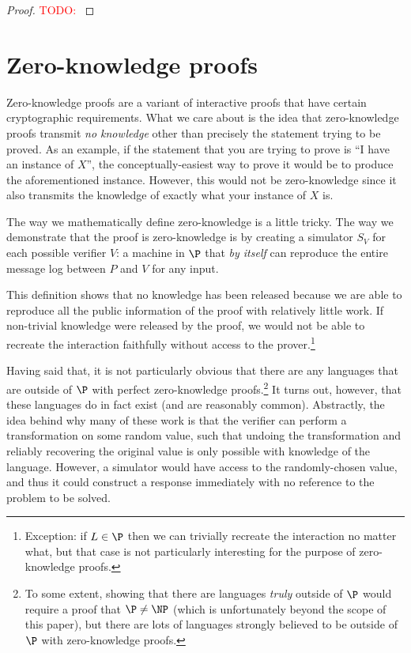\documentclass[english,12pt]{reedthesis}
\theoremstyle{plain}
\theoremstyle{definition}
\theoremstyle{remark}
\newcommand{\TODO}[1]{\textcolor{red}{TODO: #1}}
\begin{document}
\begin{proof}
  \TODO{}
\end{proof}

\section{Zero-knowledge proofs}\label{sec:zero-knowledge}

Zero-knowledge proofs are a variant of interactive proofs that have certain
cryptographic requirements. What we care about is the idea that zero-knowledge
proofs transmit \emph{no knowledge} other than precisely the statement trying to
be proved. As an example, if the statement that you are trying to prove is ``I
have an instance of $X$'', the conceptually-easiest way to prove it would be to
produce the aforementioned instance. However, this would not be zero-knowledge
since it also transmits the knowledge of exactly what your instance of $X$ is.

The way we mathematically define zero-knowledge is a little tricky. The way we
demonstrate that the proof is zero-knowledge is by creating a simulator $S_{V}$
for each possible verifier $V$: a machine in $\P$ that \emph{by itself} can
reproduce the entire message log between $P$ and $V$ for any input.

This definition shows that no knowledge has been released because we are able to
reproduce all the public information of the proof with relatively little work.
If non-trivial knowledge were released by the proof, we would not be able to
recreate the interaction faithfully without access to the
prover.\footnote{Exception: if $L \in \P$ then we can trivially recreate the
  interaction no matter what, but that case is not particularly interesting for
  the purpose of zero-knowledge proofs.}

Having said that, it is not particularly obvious that there are any languages
that are outside of $\P$ with perfect zero-knowledge proofs.\footnote{To some
  extent, showing that there are languages \emph{truly} outside of $\P$ would
  require a proof that $\P \ne \NP$ (which is unfortunately beyond the scope of
  this paper), but there are lots of languages strongly believed to be outside
  of $\P$ with zero-knowledge proofs.} It turns out, however, that these
languages do in fact exist (and are reasonably common). Abstractly, the idea
behind why many of these work is that the verifier can perform a transformation
on some random value, such that undoing the transformation and reliably
recovering the original value is only possible with knowledge of the language.
However, a simulator would have access to the randomly-chosen value, and thus it
could construct a response immediately with no reference to the problem to be
solved.
\end{document}
